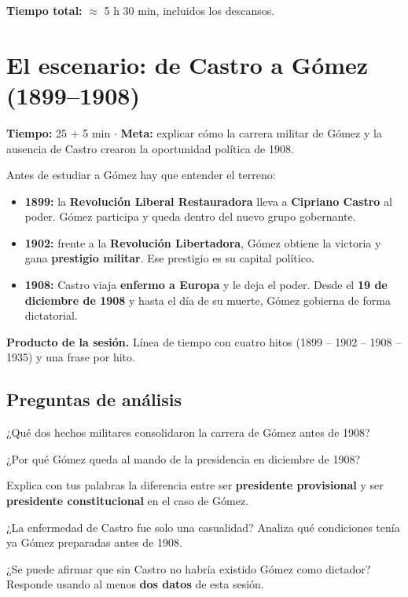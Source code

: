 \documentclass[12pt, letterpaper]{article}
\makeatletter
\let\mw@oldsection\section
\newcommand{\mw@prepage}{%
  \par
  \ifdim\pagegoal=\maxdimen\else
    \ifdim\dimexpr\pagegoal-\pagetotal\relax<7cm\relax
      \newpage
    \fi
  \fi}
\renewcommand{\section}{\mw@prepage\mw@oldsection}
\newcommand{\metasesion}[2]{%
  \begin{cabecerasesion}
    \small
    \textbf{\color{mwprimario}Tiempo:} #1 \quad$\cdot$\quad
    \textbf{\color{mwprimario}Meta:} #2
  \end{cabecerasesion}%
}
\makeatother
\begin{document}
\noindent\small\textbf{Tiempo total:} $\approx$ 5 h 30 min, incluidos los
descansos.

\newpage

\section{El escenario: de Castro a Gómez (1899--1908)}

\metasesion{25 + 5 min}{explicar cómo la carrera militar de Gómez y la ausencia
de Castro crearon la oportunidad política de 1908.}

Antes de estudiar a Gómez hay que entender el terreno:

\begin{itemize}[leftmargin=*, itemsep=3pt]
  \item \textbf{1899:} la \textbf{Revolución Liberal Restauradora} lleva a
        \textbf{Cipriano Castro} al poder. Gómez participa y queda dentro del
        nuevo grupo gobernante.
  \item \textbf{1902:} frente a la \textbf{Revolución Libertadora}, Gómez
        obtiene la victoria y gana \textbf{prestigio militar}. Ese prestigio es
        su capital político.
  \item \textbf{1908:} Castro viaja \textbf{enfermo a Europa} y le deja el
        poder. Desde el \textbf{19 de diciembre de 1908} y hasta el día de su
        muerte, Gómez gobierna de forma dictatorial.
\end{itemize}

\begin{cuadropasos}
  \small
  \textbf{Producto de la sesión.} Línea de tiempo con cuatro hitos
  (1899 -- 1902 -- 1908 -- 1935) y una frase por hito.
\end{cuadropasos}

\subsection*{Preguntas de análisis}
\begin{preguntas}
  \item \facil{} ¿Qué dos hechos militares consolidaron la carrera de Gómez antes
        de 1908?
  \item \facil{} ¿Por qué Gómez queda al mando de la presidencia en diciembre de
        1908?
  \item \medio{} Explica con tus palabras la diferencia entre ser
        \textbf{presidente provisional} y ser \textbf{presidente
        constitucional} en el caso de Gómez.
  \item \dificil{} ¿La enfermedad de Castro fue solo una casualidad? Analiza qué
        condiciones tenía ya Gómez preparadas antes de 1908.
  \item \muyDificil{} ¿Se puede afirmar que sin Castro no habría existido Gómez
        como dictador? Responde usando al menos \textbf{dos datos} de esta
        sesión.
\end{preguntas}
\end{document}
